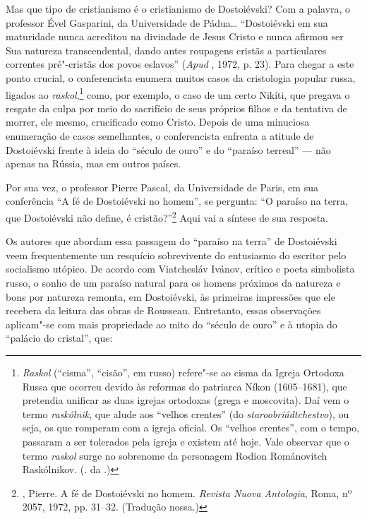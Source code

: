 Mas que tipo de cristianismo é o cristianismo de Dostoiévski? Com a
palavra, o professor Ével Gasparini, da Universidade de Pádua\ldots{}
``Dostoiévski em sua maturidade nunca acreditou na divindade de Jesus
Cristo e nunca afirmou ser Sua natureza transcendental, dando antes
roupagens cristãs a particulares correntes pré"-cristãs dos povos
eslavos'' (\emph{Apud} , 1972, p. 23). Para chegar a este ponto
crucial, o conferencista enumera muitos casos da cristologia popular
russa, ligados ao \emph{raskol},\footnote{\emph{Raskol} (``cisma'',
  ``cisão'', em russo) refere"-se ao cisma da Igreja Ortodoxa Russa que
  ocorreu devido às reformas do patriarca Níkon (1605--1681), que
  pretendia unificar as duas igrejas ortodoxas (grega e moscovita). Daí
  vem o termo \emph{raskólnik}, que alude aos ``velhos crentes'' (do
  \emph{staroobriádtchestvo}), ou seja, os que romperam com a igreja
  oficial. Os ``velhos crentes'', com o tempo, passaram a ser tolerados
  pela igreja e existem até hoje. Vale observar que o termo
  \emph{raskol} surge no sobrenome da personagem Rodion Románovitch
  Raskólnikov. (. da .)} como, por exemplo, o caso de um certo
Nikíti, que pregava o resgate da culpa por meio do sacrifício de seus
próprios filhos e da tentativa de morrer, ele mesmo, crucificado como
Cristo. Depois de uma minuciosa enumeração de casos semelhantes, o
conferencista enfrenta a atitude de Dostoiévski frente à ideia do
``século de ouro'' e do ``paraíso terreal'' --- não apenas na Rússia, mas
em outros países.

Por sua vez, o professor Pierre Pascal, da Universidade de Paris, em sua
conferência ``A fé de Dostoiévski no homem'', se pergunta: ``O paraíso
na terra, que Dostoiévski não define, é cristão?''\footnote{,
  Pierre. A fé de Dostoiévski no homem. \emph{Revista Nuova Antologia}, Roma, nº 2057, 1972, pp. 31--32. (Tradução nossa.)} Aqui vai a síntese de sua
resposta.

Os autores que abordam essa passagem do ``paraíso na terra'' de
Dostoiévski veem frequentemente um resquício sobrevivente do entusiasmo
do escritor pelo socialismo utópico. De acordo com Viatchesláv Ivánov,
crítico e poeta simbolista russo, o sonho de um paraíso natural para os
homens próximos da natureza e bons por natureza remonta, em Dostoiévski,
às primeiras impressões que ele recebera da leitura das obras de
Rousseau. Entretanto, essas observações aplicam"-se com mais propriedade
ao mito do ``século de ouro'' e à utopia do ``palácio do cristal'', que:

